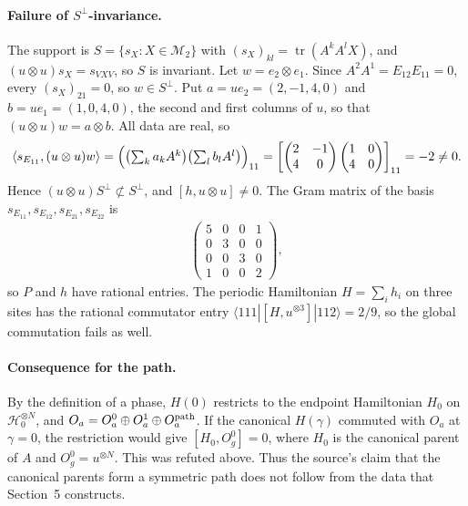 \documentclass{article}
\begin{document}
\paragraph{Failure of $S^\perp$-invariance.} The support is
$S=\{s_X : X\in\mathcal M_2\}$ with
$(s_X)_{kl}=\operatorname{tr}(A^kA^lX)$, and
$(u\otimes u)s_X=s_{VXV}$, so $S$ is invariant. Let $w=e_2\otimes e_1$.
Since $A^2A^1=E_{12}E_{11}=0$, every $(s_X)_{21}=0$, so $w\in S^\perp$.
Put $a=ue_2=(2,-1,4,0)$ and $b=ue_1=(1,0,4,0)$, the second and first
columns of $u$, so that $(u\otimes u)w=a\otimes b$. All data are real, so
\begin{align}
    \langle s_{E_{11}},(u\otimes u)w\rangle
    =\Bigl(\bigl(\textstyle\sum_ka_kA^k\bigr)
    \bigl(\textstyle\sum_lb_lA^l\bigr)\Bigr)_{11}
    =\left[\begin{pmatrix}2&-1\\4&0\end{pmatrix}
        \begin{pmatrix}1&0\\4&0\end{pmatrix}\right]_{11}
    =-2\neq0.
    \label{eq:glm23_parent_commutation_perp_overlap}
\end{align}
Hence $(u\otimes u)S^\perp\not\subset S^\perp$, and
$[h,u\otimes u]\neq0$. The Gram matrix of the basis
$s_{E_{11}},s_{E_{12}},s_{E_{21}},s_{E_{22}}$ is
\begin{align}
    \begin{pmatrix}5&0&0&1\\0&3&0&0\\0&0&3&0\\1&0&0&2\end{pmatrix},
    \label{eq:glm23_parent_commutation_support_gram}
\end{align}
so $P$ and $h$ have rational entries. The periodic Hamiltonian
$H=\sum_ih_i$ on three sites has the rational commutator entry
$\langle 111|[H,u^{\otimes3}]|112\rangle=2/9$, so the global
commutation fails as well.

\paragraph{Consequence for the path.} By the definition of a phase,
$H(0)$ restricts to the endpoint Hamiltonian $H_0$ on
$\mathcal H_0^{\otimes N}$, and $O_a=O^0_a\oplus O^1_a\oplus O^{\rm path}_a$.
If the canonical $H(\gamma)$ commuted with $O_a$ at $\gamma=0$, the
restriction would give $[H_0,O^0_g]=0$, where $H_0$ is the canonical
parent of $A$ and $O^0_g=u^{\otimes N}$. This was refuted above. Thus the
source's claim that the canonical parents form a symmetric path does not
follow from the data that Section~5 constructs.
\end{document}
